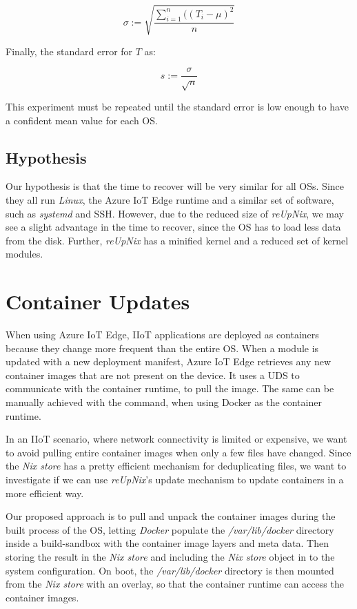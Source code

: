 \begin{equation}
   \sigma := \sqrt{\frac{\sum_{i=1}^{n}((T_i - \mu)^2}{n}}
\end{equation}

\noindent
Finally, the standard error for $T$ as:

\begin{equation}
    s := \frac{\sigma}{\sqrt{n}}
\end{equation}

\noindent
This experiment must be repeated until the standard error is low enough
to have a confident mean value for each \ac{OS}.

\subsection{Hypothesis}
Our hypothesis is that the time to recover will be very similar for all
\ac{OS}s. Since they all run \textit{Linux}, the Azure IoT Edge runtime and
a similar set of software, such as \textit{systemd} and \ac{SSH}. However, due
to the reduced size of \textit{reUpNix}, we may see a slight advantage in the
time to recover, since the \ac{OS} has to load less data from the disk. Further,
\textit{reUpNix} has a minified kernel and a reduced set of kernel modules.

\section{Container Updates}
\label{sec:container-updates}
When using Azure IoT Edge, \ac{IIoT} applications are deployed as containers because
they change more frequent than the entire \ac{OS}. When a module is updated
with a new deployment manifest, Azure IoT Edge retrieves any new container
images that are not present on the device. It uses a \ac{UDS} to communicate
with the container runtime, to pull the image. The same can be manually achieved
with the  command, when using Docker as the container runtime.

In an \ac{IIoT} scenario, where network connectivity is limited or expensive,
we want to avoid pulling entire container images when only a few files have
changed. Since the \textit{Nix store} has a pretty efficient mechanism for
deduplicating files, we want to investigate if we can use \textit{reUpNix}'s
update mechanism to update containers in a more efficient way.

Our proposed approach is to pull and unpack the container images during the built
process of the \ac{OS}, letting \textit{Docker} populate the \textit{/var/lib/docker}
directory inside a build-sandbox with the container image layers and meta data.
Then storing the result in the \textit{Nix store} and including the
\textit{Nix store} object in to the system configuration. On boot, the
\textit{/var/lib/docker} directory is then mounted from the \textit{Nix store}
with an overlay, so that the container runtime can access the container images.

